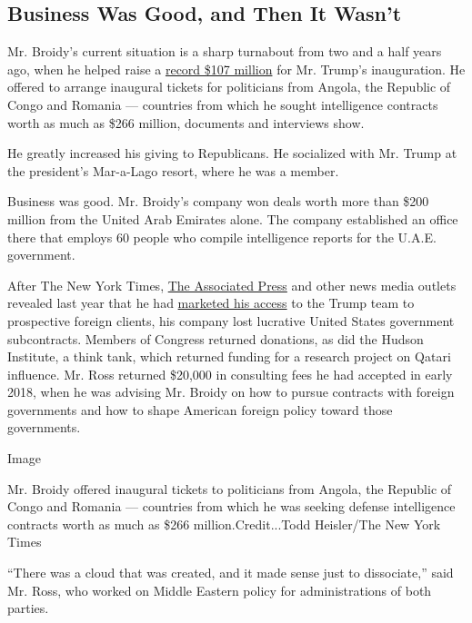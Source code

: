 \hypertarget{business-was-good-and-then-it-wasnt}{%
\subsection{Business Was Good, and Then It
Wasn't}\label{business-was-good-and-then-it-wasnt}}

Mr. Broidy's current situation is a sharp turnabout from two and a half
years ago, when he helped raise a
\href{https://www.nytimes.com/2017/04/18/us/politics/trump-inauguration-fundraising.html}{record
\$107 million} for Mr. Trump's inauguration. He offered to arrange
inaugural tickets for politicians from Angola, the Republic of Congo and
Romania --- countries from which he sought intelligence contracts worth
as much as \$266 million, documents and interviews show.

He greatly increased his giving to Republicans. He socialized with Mr.
Trump at the president's Mar-a-Lago resort, where he was a member.

Business was good. Mr. Broidy's company won deals worth more than \$200
million from the United Arab Emirates alone. The company established an
office there that employs 60 people who compile intelligence reports for
the U.A.E. government.

After The New York Times,
\href{https://www.apnews.com/a3521859cf8d4c199cb9a8567abd2b71}{The
Associated Press} and other news media outlets revealed last year that
he had
\href{https://www.nytimes.com/2018/03/25/us/politics/elliott-broidy-trump-access-circinus-lobbying.html}{marketed
his access} to the Trump team to prospective foreign clients, his
company lost lucrative United States government subcontracts. Members of
Congress returned donations, as did the Hudson Institute, a think tank,
which returned funding for a research project on Qatari influence. Mr.
Ross returned \$20,000 in consulting fees he had accepted in early 2018,
when he was advising Mr. Broidy on how to pursue contracts with foreign
governments and how to shape American foreign policy toward those
governments.

Image

Mr. Broidy offered inaugural tickets to politicians from Angola, the
Republic of Congo and Romania --- countries from which he was seeking
defense intelligence contracts worth as much as \$266
million.Credit...Todd Heisler/The New York Times

``There was a cloud that was created, and it made sense just to
dissociate,'' said Mr. Ross, who worked on Middle Eastern policy for
administrations of both parties.

